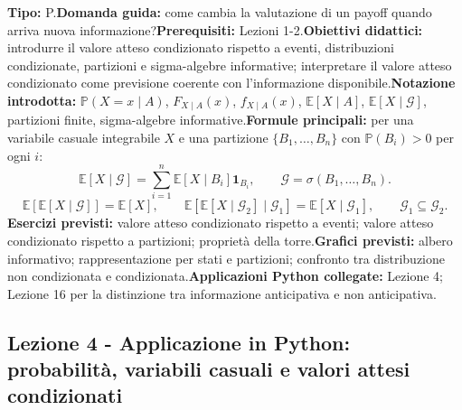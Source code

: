 \documentclass[12pt,a4paper]{article}%
\newcommand{\1}{\mathbf{1}}
\begin{document}
\textbf{Tipo:} P.\newline\textbf{Domanda guida:} come cambia la valutazione di
un payoff quando arriva nuova informazione?\newline\textbf{Prerequisiti:}
Lezioni 1-2.\newline\textbf{Obiettivi didattici:} introdurre il valore atteso
condizionato rispetto a eventi, distribuzioni condizionate, partizioni e
sigma-algebre informative; interpretare il valore atteso condizionato come
previsione coerente con l'informazione disponibile.\newline\textbf{Notazione
introdotta:} $\mathbb{P}(X=x\mid A)$, $F_{X\mid A}(x)$, $f_{X\mid A}(x)$,
$\mathbb{E}[X\mid A]$, $\mathbb{E}[X\mid\mathcal{G}]$, partizioni finite,
sigma-algebre informative.\newline\textbf{Formule principali:} per una variabile casuale integrabile $X$ e
una partizione $\{B_1,\ldots,B_n\}$ con
$\mathbb{P}(B_i)>0$ per ogni $i$:
\[
\mathbb{E}[X\mid\mathcal{G}]
=
\sum_{i=1}^{n}\mathbb{E}[X\mid B_i]\1_{B_i},
\qquad
\mathcal{G}=\sigma(B_1,\ldots,B_n).
\]
\[
\mathbb{E}[\mathbb{E}[X\mid\mathcal{G}]]=\mathbb{E}[X], \qquad\mathbb{E}%
[\mathbb{E}[X\mid\mathcal{G}_{2}]\mid\mathcal{G}_{1}]=\mathbb{E}%
[X\mid\mathcal{G}_{1}], \qquad\mathcal{G}_{1}\subseteq\mathcal{G}_{2}.
\]
\textbf{Esercizi previsti:} valore atteso condizionato rispetto a eventi;
valore atteso condizionato rispetto a partizioni; propriet\`{a} della
torre.\newline\textbf{Grafici previsti:} albero informativo; rappresentazione
per stati e partizioni; confronto tra distribuzione non condizionata e
condizionata.\newline\textbf{Applicazioni Python collegate:} Lezione 4;
Lezione 16 per la distinzione tra informazione anticipativa e non
anticipativa.

\subsection{Lezione 4 - Applicazione in Python: probabilit\`{a}, variabili
casuali e valori attesi condizionati}
\end{document}
